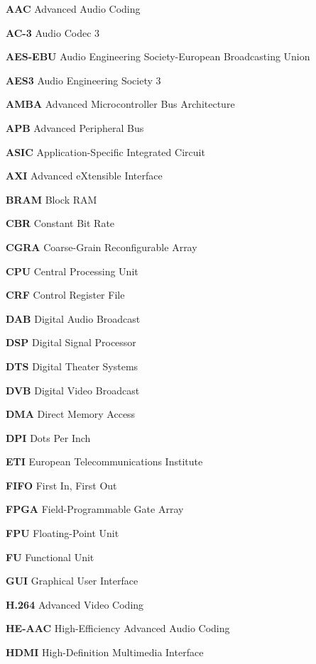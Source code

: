 \begin{description}
    \vspace{1mm}
    \item \textbf{AAC} Advanced Audio Coding
    \item \textbf{AC-3} Audio Codec 3
    \item \textbf{AES-EBU} Audio Engineering Society-European Broadcasting Union
    \item \textbf{AES3} Audio Engineering Society 3
    \item \textbf{AMBA} Advanced Microcontroller Bus Architecture
    \item \textbf{APB} Advanced Peripheral Bus
    \item \textbf{ASIC} Application-Specific Integrated Circuit
    \item \textbf{AXI} Advanced eXtensible Interface
    \item \textbf{BRAM} Block RAM
    \item \textbf{CBR} Constant Bit Rate
    \item \textbf{CGRA} Coarse-Grain Reconfigurable Array
    \item \textbf{CPU} Central Processing Unit
    \item \textbf{CRF} Control Register File
    \item \textbf{DAB} Digital Audio Broadcast
    \item \textbf{DSP} Digital Signal Processor
    \item \textbf{DTS} Digital Theater Systems
    \item \textbf{DVB} Digital Video Broadcast
    \item \textbf{DMA} Direct Memory Access
    \item \textbf{DPI} Dots Per Inch
    \item \textbf{ETI} European Telecommunications Institute
    \item \textbf{FIFO} First In, First Out
    \item \textbf{FPGA} Field-Programmable Gate Array
    \item \textbf{FPU} Floating-Point Unit
    \item \textbf{FU} Functional Unit
    \item \textbf{GUI} Graphical User Interface
    \item \textbf{H.264} Advanced Video Coding
    \item \textbf{HE-AAC} High-Efficiency Advanced Audio Coding
    \item \textbf{HDMI} High-Definition Multimedia Interface

\end{description}
